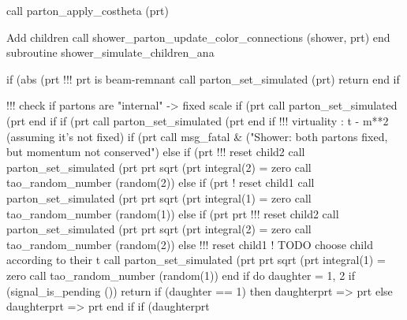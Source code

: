     call parton_apply_costheta (prt)

    \LA{}Add children\RA{}
    call shower_parton_update_color_connections (shower, prt)
  end subroutine shower_simulate_children_ana

\eatline
\nwendcode{}\nwdocspar
\nwenddocs{}\endmoddef
if (abs (prt%
   !!! prt is beam-remnant
   call parton_set_simulated (prt)
   return
end if

!!! check if partons are "internal" -> fixed scale
if (prt%
   call parton_set_simulated (prt%
end if
if (prt%
   call parton_set_simulated (prt%
end if
\nwendcode{}\nwdocspar
\nwenddocs{}\endmoddef
!!! virtuality : t - m**2 (assuming it's not fixed)
if (prt%
   call msg_fatal &
        ("Shower: both partons fixed, but momentum not conserved")
else if (prt%
   !!! reset child2
   call parton_set_simulated (prt%
   prt%
        sqrt (prt%
   integral(2) = zero
   call tao_random_number (random(2))
else if (prt%
   ! reset child1
   call parton_set_simulated (prt%
   prt%
        sqrt (prt%
   integral(1) = zero
   call tao_random_number (random(1))
else if (prt%
     prt%
   !!! reset child2
   call parton_set_simulated (prt%
   prt%
        sqrt (prt%
   integral(2) = zero
   call tao_random_number (random(2))
else
   !!! reset child1 ! TODO choose child according to their t
   call parton_set_simulated (prt%
   prt%
        sqrt (prt%
   integral(1) = zero
   call tao_random_number (random(1))
end if
\nwendcode{}\nwdocspar
\nwenddocs{}\endmoddef
do daughter = 1, 2
   if (signal_is_pending ()) return
   if (daughter == 1) then
      daughterprt => prt%
   else
      daughterprt => prt%
   end if
   if (daughterprt%
